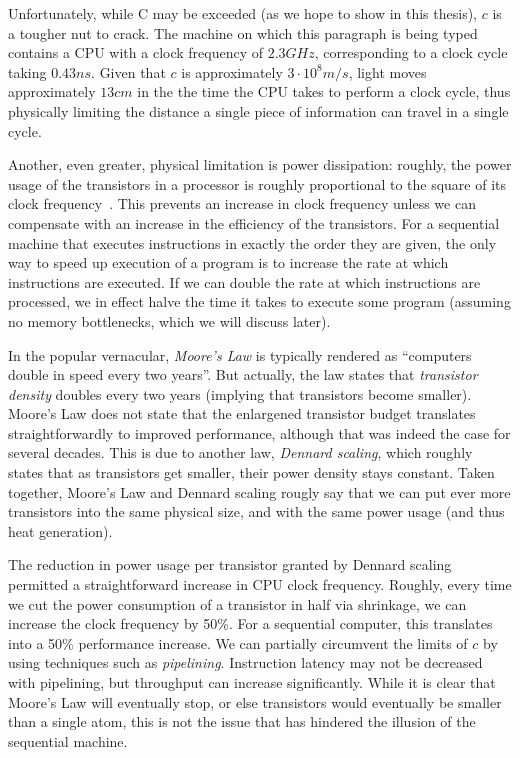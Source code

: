 Unfortunately, while C may be exceeded (as we hope to show in this
thesis), $c$ is a tougher nut to crack.  The machine on which this
paragraph is being typed contains a CPU with a clock frequency of
$2.3GHz$, corresponding to a clock cycle taking $0.43ns$.  Given that
$c$ is approximately $3\cdot10^{8}m/s$, light moves approximately
$13cm$ in the the time the CPU takes to perform a clock cycle, thus
physically limiting the distance a single piece of information can
travel in a single cycle.

Another, even greater, physical limitation is power dissipation:
roughly, the power usage of the transistors in a processor is roughly
proportional to the square of its clock
frequency~\cite{Dubois:2012:PCO:2462779}.  This prevents an increase
in clock frequency unless we can compensate with an increase in the
efficiency of the transistors.  For a sequential machine that executes
instructions in exactly the order they are given, the only way to
speed up execution of a program is to increase the rate at which
instructions are executed.  If we can double the rate at which
instructions are processed, we in effect halve the time it takes to
execute some program (assuming no memory bottlenecks, which we will
discuss later).

In the popular vernacular, \textit{Moore's Law} is typically rendered
as ``computers double in speed every two years''.  But actually, the
law states that \textit{transistor density} doubles every two years
(implying that transistors become smaller).  Moore's Law does not
state that the enlargened transistor budget translates
straightforwardly to improved performance, although that was indeed
the case for several decades.  This is due to another law,
\textit{Dennard scaling}, which roughly states that as transistors get
smaller, their power density stays constant.  Taken together, Moore's
Law and Dennard scaling rougly say that we can put ever more
transistors into the same physical size, and with the same power usage
(and thus heat generation).

The reduction in power usage per transistor granted by Dennard scaling
permitted a straightforward increase in CPU clock frequency.  Roughly,
every time we cut the power consumption of a transistor in half via
shrinkage, we can increase the clock frequency by 50\%.  For a
sequential computer, this translates into a 50\% performance increase.
We can partially circumvent the limits of $c$ by using techniques such
as \textit{pipelining}.  Instruction latency may not be decreased with
pipelining, but throughput can increase significantly.  While it is
clear that Moore's Law will eventually stop, or else transistors would
eventually be smaller than a single atom, this is not the issue that
has hindered the illusion of the sequential machine.

